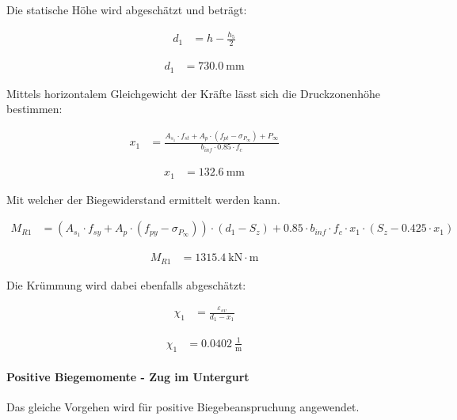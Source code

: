 \documentclass[
  11pt,
  letterpaper,
]{scrreprt}
\let\oldparagraph\paragraph
\renewcommand{\paragraph}[1]{\oldparagraph{#1}\mbox{}}
\begin{document}
Die statische Höhe wird abgeschätzt und beträgt:

$$
\begin{aligned}
d_{1} &= h - \frac{ h_{5} }{ 2 } \; 
\end{aligned}
$$

$$
\begin{aligned}
d_{1} &= 730.0\ \mathrm{mm} \;
\end{aligned}
$$

Mittels horizontalem Gleichgewicht der Kräfte lässt sich die
Druckzonenhöhe bestimmen:

$$
\begin{aligned}
x_{1} &= \frac{ A_{s_{1}} \cdot f_{st} + A_{p} \cdot \left( f_{pt} - \sigma_{P_{\infty}} \right) + P_{\infty} }{ b_{inf} \cdot 0.85 \cdot f_{c} } \; 
\end{aligned}
$$

$$
\begin{aligned}
x_{1} &= 132.6\ \mathrm{mm} \;
\end{aligned}
$$

Mit welcher der Biegewiderstand ermittelt werden kann.

$$
\begin{aligned}
M_{R1} &= \left( A_{s_{1}} \cdot f_{sy} + A_{p} \cdot \left( f_{py} - \sigma_{P_{\infty}} \right) \right) \cdot \left( d_{1} - S_{z} \right) + 0.85 \cdot b_{inf} \cdot f_{c} \cdot x_{1} \cdot \left( S_{z} - 0.425 \cdot x_{1} \right) \; 
\end{aligned}
$$

$$
\begin{aligned}
M_{R1} &= 1315.4\ \mathrm{kN} \cdot \mathrm{m} \;
\end{aligned}
$$

Die Krümmung wird dabei ebenfalls abgeschätzt:

$$
\begin{aligned}
\chi_{1} &= \frac{ \varepsilon_{sv} }{ d_{1} - x_{1} } \; 
\end{aligned}
$$

$$
\begin{aligned}
\chi_{1} &= 0.0402\ \frac{1}{\mathrm{m}} \;
\end{aligned}
$$

\paragraph{Positive Biegemomente - Zug im
Untergurt}\label{positive-biegemomente---zug-im-untergurt}

Das gleiche Vorgehen wird für positive Biegebeanspruchung angewendet.
\end{document}
